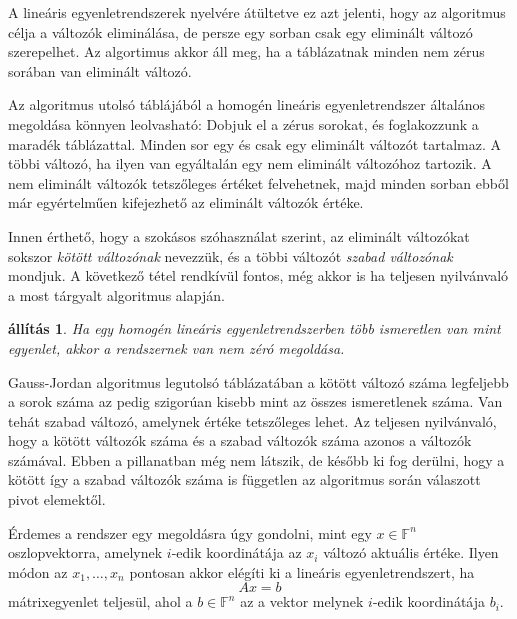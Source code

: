 \documentclass[9pt, showtrims]{memoir}
\makeatletter
\renewenvironment{proof}[1][\proofname]
    {\par\pushQED{\qed}%
    \normalfont \topsep6\p@\@plus6\p@\relax
    \trivlist
    \item[\hskip\labelsep
        \itshape
    #1\@addpunct{:}]\ignorespaces}
    {\popQED\endtrivlist\@endpefalse}
\theoremstyle{plain}
\newtheorem{proposition}{állítás}[section]
\theoremstyle{remark}
\theoremstyle{definition}
\renewcommand{\mathbf}{\mathbb}
\makeatother
\begin{document}
A lineáris egyenletrendszerek nyelvére átültetve ez azt jelenti, 
hogy az algoritmus célja a változók eliminálása,
de persze egy sorban csak egy eliminált változó szerepelhet.
Az algortimus akkor áll meg, 
ha a táblázatnak minden nem zérus sorában van eliminált változó.

Az algoritmus utolsó táblájából a homogén lineáris egyenletrendszer általános megoldása könnyen leolvasható:
Dobjuk el a zérus sorokat, és foglakozzunk a maradék táblázattal.
Minden sor egy és csak egy eliminált változót tartalmaz.
A többi változó, ha ilyen van egyáltalán egy nem eliminált változóhoz tartozik.
A nem eliminált változók tetszőleges értéket felvehetnek, 
majd minden sorban ebből már egyértelműen kifejezhető az eliminált változók értéke.

Innen érthető, 
hogy a szokásos szóhasználat szerint, az eliminált változókat sokszor
\emph{kötött változónak}
nevezzük,
és a többi változót 
\emph{szabad változónak}
mondjuk.
A következő tétel rendkívül fontos, még akkor is ha teljesen nyilvánvaló a most tárgyalt algoritmus alapján.
\begin{proposition}
    Ha egy homogén lineáris egyenletrendszerben több ismeretlen van mint egyenlet,
    akkor a rendszernek van nem zéró megoldása.
\end{proposition}
\begin{proof}
    Gauss-Jordan algoritmus legutolsó táblázatában
    a kötött változó száma legfeljebb a sorok száma az pedig szigorúan kisebb mint az összes ismeretlenek száma.
    Van tehát szabad változó, amelynek értéke tetszőleges lehet.
\end{proof}
Az teljesen nyilvánvaló, hogy a kötött változók száma és a szabad változók száma azonos a változók számával.
Ebben a pillanatban még nem látszik,
de később ki fog derülni, 
hogy a kötött így a szabad változók száma is független az algoritmus során válaszott pivot elemektől.

Érdemes a rendszer egy megoldásra úgy gondolni, mint egy $x\in\mathbf{F}^n$ oszlopvektorra,
amelynek $i$-edik koordinátája az $x_i$ változó aktuális értéke.
Ilyen módon az $x_1,\dots,x_n$ pontosan akkor elégíti ki a lineáris egyenletrendszert,
ha
\[
    Ax=b
\]
mátrixegyenlet teljesül, ahol a $b\in\mathbf{F}^n$ az a vektor melynek $i$-edik koordinátája $b_i$.
\end{document}
